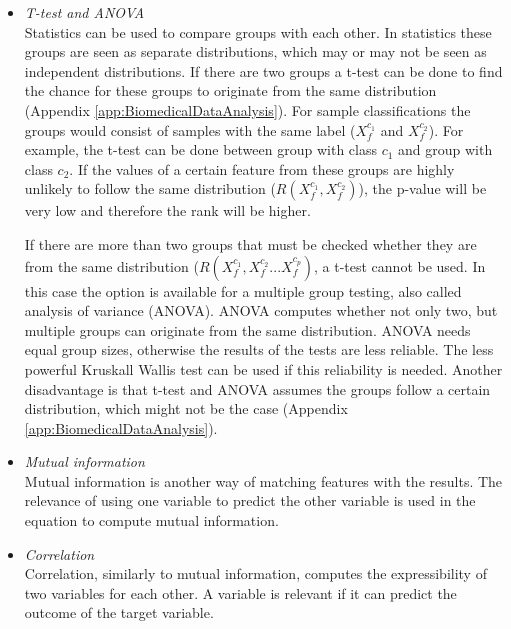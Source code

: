 \documentclass[10pt,a4paper]{report}
\begin{document}
	\begin{itemize}
		\item \textit{T-test and ANOVA} \\ 
		Statistics can be used to compare groups with each other. In statistics these groups are seen as separate distributions, which may or may not be seen as independent distributions. If there are two groups  a t-test can be done to find the chance for these groups to originate from the same distribution\cite{heiberger2004statistical} (Appendix \ref{app:BiomedicalDataAnalysis}). 
		For sample classifications the groups would consist of samples with the same label ($X_{f}^{c_1}$  and $X_{f}^{c_2}$). For example, the t-test can be done between group with class $c_1$ and group with class $c_2$. If the values of a certain feature from these groups are highly unlikely to follow the same distribution ($R(X_{f}^{c_1}, X_{f}^{c_2})$), the p-value will be very low and therefore the rank will be higher.
		
		If there are more than two groups that must be checked whether they are from the same distribution ($R(X_{f}^{c_1}, X_{f}^{c_2} ... X_{f}^{c_p})$, a t-test cannot be used. In this case the option is available for a multiple group testing, also called analysis of variance (ANOVA). ANOVA computes whether not only two, but multiple groups can originate from the same distribution. ANOVA needs equal group sizes, otherwise the results of the tests are less reliable. The less powerful Kruskall Wallis test can be used if this reliability is needed. Another disadvantage is that t-test and ANOVA assumes the groups follow a certain distribution, which might not be the case\cite{heiberger2004statistical} (Appendix \ref{app:BiomedicalDataAnalysis}).
		
		\item \textit{Mutual information} \\
		Mutual information is another way of matching features with the results. The relevance of using one variable to predict the other variable is used in the equation to compute mutual information. 
		
		\item \textit{Correlation} \\
		Correlation, similarly to mutual information, computes the expressibility of two variables for each other. A variable is relevant if it can predict the outcome of the target variable.
		
	\end{itemize}
	
\end{document}
